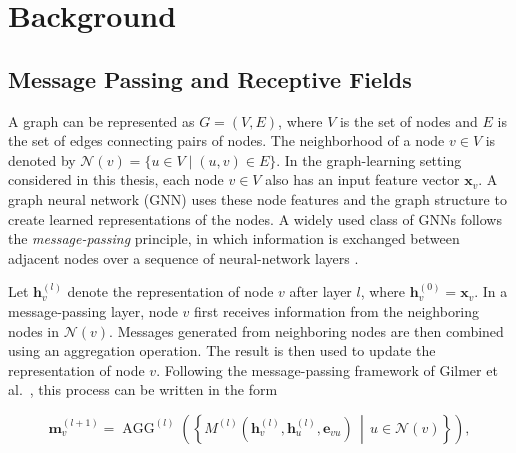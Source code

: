 \documentclass[english]{lni}
\begin{document}



\section{Background}
\label{sec:background}



\subsection{Message Passing and Receptive Fields}
\label{sec:message-passing}

A graph can be represented as $G=(V,E)$, where $V$ is the set of nodes and $E$ is the set of edges connecting pairs of nodes. The neighborhood of a node $v\in V$ is denoted by $\mathcal{N}(v)=\{u\in V\mid (u,v)\in E\}$. In the graph-learning setting considered in this thesis, each node $v\in V$ also has an input feature vector $\mathbf{x}_v$. A graph neural network (GNN) uses these node features and the graph structure to create learned representations of the nodes. A widely used class of GNNs follows the \emph{message-passing} principle, in which information is exchanged between adjacent nodes over a sequence of neural-network layers \cite{gilmer2017mpnn}.

Let $\mathbf{h}_v^{(l)}$ denote the representation of node $v$ after layer $l$, where $\mathbf{h}_v^{(0)}=\mathbf{x}_v$. In a message-passing layer, node $v$ first receives information from the neighboring nodes in $\mathcal{N}(v)$. Messages generated from neighboring nodes are then combined using an aggregation operation. The result is then used to update the representation of node $v$. Following the message-passing framework of Gilmer et al.\ \cite{gilmer2017mpnn}, this process can be written in the form

\begin{equation}
    \mathbf{m}_v^{(l+1)}
    =
    \operatorname{AGG}^{(l)}
    \left(
        \left\{
            M^{(l)}
            \left(
                \mathbf{h}_v^{(l)},
                \mathbf{h}_u^{(l)},
                \mathbf{e}_{vu}
            \right)
            \,\middle|\,
            u\in\mathcal{N}(v)
        \right\}
    \right),
    \label{eq:message-aggregation}
\end{equation}
\end{document}
